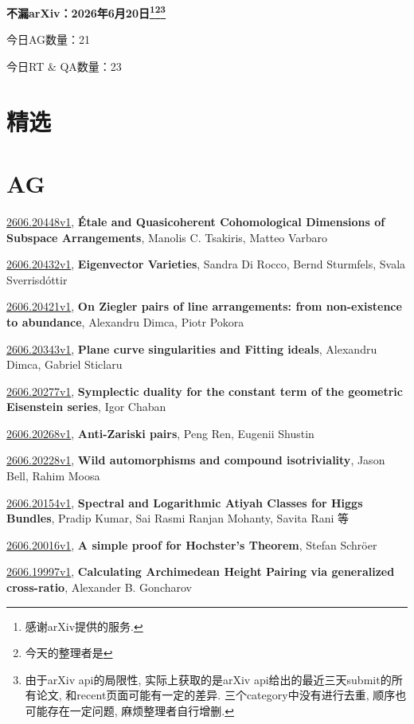 \documentclass[9pt, a4paper]{article}
\theoremstyle{plain}
\theoremstyle{definition}
\theoremstyle{remark}
\newcommand{\arxiv}[3]{\href{https://arxiv.org/abs/#1}{#1}, \textbf{\textcolor{arxivblue}{#2}}, #3}
\newcommand{\AGnumber}{21}
\newcommand{\RTQAnumber}{23}
\newcommand{\NewestDate}{2026年6月20日}
\newcommand{\todayarXiver}{} %
\begin{document}
\begin{center}
    \Huge\textbf{不漏arXiv：\NewestDate\footnote{感谢arXiv提供的服务.}\footnote{今天的整理者是\todayarXiver}\footnote{由于arXiv api的局限性, 实际上获取的是arXiv api给出的最近三天submit的所有论文, 和recent页面可能有一定的差异. 三个category中没有进行去重, 顺序也可能存在一定问题, 麻烦整理者自行增删.}} \\
\end{center}

\setcounter{section}{-1}

\begin{center}
    今日AG数量：\AGnumber
    
    今日RT \& QA数量：\RTQAnumber
    
\end{center}


\section{精选}


\section{AG}
\arxiv{2606.20448v1}{Étale and Quasicoherent Cohomological Dimensions of Subspace Arrangements}{Manolis C. Tsakiris, Matteo Varbaro}

\arxiv{2606.20432v1}{Eigenvector Varieties}{Sandra Di Rocco, Bernd Sturmfels, Svala Sverrisdóttir}

\arxiv{2606.20421v1}{On Ziegler pairs of line arrangements: from non-existence to abundance}{Alexandru Dimca, Piotr Pokora}

\arxiv{2606.20343v1}{Plane curve singularities and Fitting ideals}{Alexandru Dimca, Gabriel Sticlaru}

\arxiv{2606.20277v1}{Symplectic duality for the constant term of the geometric Eisenstein series}{Igor Chaban}

\arxiv{2606.20268v1}{Anti-Zariski pairs}{Peng Ren, Eugenii Shustin}

\arxiv{2606.20228v1}{Wild automorphisms and compound isotriviality}{Jason Bell, Rahim Moosa}

\arxiv{2606.20154v1}{Spectral and Logarithmic Atiyah Classes for Higgs Bundles}{Pradip Kumar, Sai Rasmi Ranjan Mohanty, Savita Rani 等}

\arxiv{2606.20016v1}{A simple proof for Hochster's Theorem}{Stefan Schröer}

\arxiv{2606.19997v1}{Calculating Archimedean Height Pairing via generalized cross-ratio}{Alexander B. Goncharov}
\end{document}
